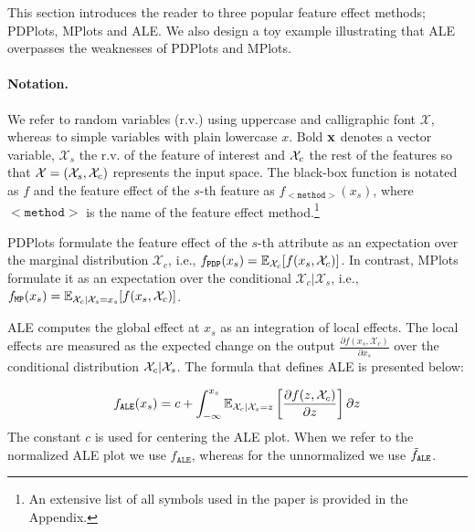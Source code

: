 This section introduces the reader to three popular feature effect methods; PDPlots, MPlots and ALE. We also design a toy example illustrating that ALE overpasses the weaknesses of PDPlots and MPlots.

\paragraph*{Notation.} We refer to random variables (r.v.) using
uppercase and calligraphic font \( \mathcal{X}\), whereas to simple
variables with plain lowercase \( x \). Bold \( \mathbf{x} \) denotes a
vector variable, \( \mathcal{X}_s \) the r.v. of the feature of
interest and \( \mathcal{X}_c \) the rest of the features so that
\( \mathcal{X} = (\mathcal{X}_s, \mathcal{X}_c ) \) represents the input space. The black-box
function is notated as \( f \) and the feature effect of the \(s\)-th
feature as \(f_{\mathtt{<method>}}(x_s)\), where \(\mathtt{<method>}\)
is the name of the feature effect method.\footnote{An extensive list
  of all symbols used in the paper is provided in the Appendix.}

PDPlots formulate the feature effect of the \(s\)-th attribute as an expectation over the marginal distribution \(\mathcal{X}_c\), i.e., \(f_{\mathtt{PDP}}(x_s) = \mathbb{\mathbb{E}}_{\mathcal{X}_c}[f(x_s,\mathcal{X}_c)]\). In contrast, MPlots formulate it as an expectation over the conditional \(\mathcal{X}_c|\mathcal{X}_s\), i.e., \(f_{\mathtt{MP}}(x_s) = \mathbb{E}_{\mathcal{X}_c|\mathcal{X}_s = x_s}[f(x_s, \mathcal{X}_c)]\).

ALE computes the global effect at \(x_s\) as an integration of local effects. The local effects are measured as the expected change on the output \( \frac{\partial f(x_s, \mathcal{X}_c)}{\partial x_s} \) over the conditional distribution \( \mathcal{X}_c|\mathcal{X}_s\). The formula that defines ALE is presented below:


\begin{gather}
  \label{eq:ALE} f_{\mathtt{ALE}}(x_s) = c + \int_{-\infty}^{x_s} \mathbb{E}_{\Xcb|\mathcal{X}_s=z}\left[\frac{\partial f(z, \mathcal{X}_c)}{\partial z}\right] \partial z %
\end{gather}
%
The constant \(c\) is used for centering the ALE plot. When we refer to the normalized ALE plot we use \(f_{\mathtt{ALE}}\), whereas for the unnormalized we use \(\Tilde{f}_{\mathtt{ALE}}\).

